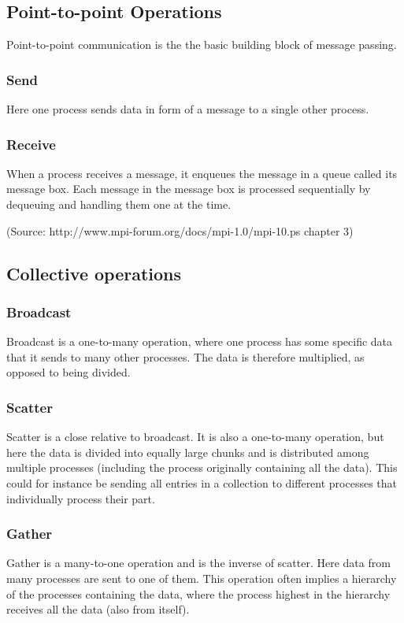 \subsection{Point-to-point Operations}
Point-to-point communication is the the basic building block of message passing.
\subsubsection{Send}
Here one process sends data in form of a message to a single other process.
\subsubsection{Receive}
When a process receives a message, it enqueues the message in a queue called its message box. Each message in the message box is processed sequentially by dequeuing and handling them one at the time.

(Source: http://www.mpi-forum.org/docs/mpi-1.0/mpi-10.ps chapter 3)

\subsection{Collective operations}
\subsubsection{Broadcast}
Broadcast is a one-to-many operation, where one process has some specific data that it sends to many other processes. The data is therefore multiplied, as opposed to being divided.

\subsubsection{Scatter}
Scatter is a close relative to broadcast. It is also a one-to-many operation, but here the data is divided into equally large chunks and is distributed among multiple processes (including the process originally containing all the data). This could for instance be sending all entries in a collection to different processes that individually process their part.

\subsubsection{Gather}
Gather is a many-to-one operation and is the inverse of scatter. Here data from many processes are sent to one of them. This operation often implies a hierarchy of the processes containing the data, where the process highest in the hierarchy receives all the data (also from itself).

